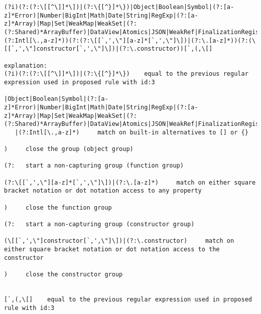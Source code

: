 \begin{lstlisting}[style=basicStyle, caption=Regular expression of proposed rule id:4, label={lst:constructorruleproposalregexC}]
(?i)(?:(?:\[[^\]]*\])|(?:\{[^}]*\})|Object|Boolean|Symbol|(?:[a-z]*Error)|Number|BigInt|Math|Date|String|RegExp|(?:[a-z]*Array)|Map|Set|WeakMap|WeakSet|(?:(?:Shared)*ArrayBuffer)|DataView|Atomics|JSON|WeakRef|FinalizationRegistry|Iterator|AsyncIterator|Promise|GeneratorFunction|AsyncGeneratorFunction|Generator|AsyncGenerator|AsyncFunction|Reflect|Proxy|(?:Intl[\.,a-z]*))(?:(?:\[[`,',\"][a-z]*[`,',\"]\])|(?:\.[a-z]*))(?:(\[[`,',\"]constructor[`,',\"]\])|(?:\.constructor))[`,(,\[]

explanation:
(?i)(?:(?:\[[^\]]*\])|(?:\{[^}]*\})    equal to the previous regular expression used in proposed rule with id:3

|Object|Boolean|Symbol|(?:[a-z]*Error)|Number|BigInt|Math|Date|String|RegExp|(?:[a-z]*Array)|Map|Set|WeakMap|WeakSet|(?:(?:Shared)*ArrayBuffer)|DataView|Atomics|JSON|WeakRef|FinalizationRegistry|Iterator|AsyncIterator|Promise|GeneratorFunction|AsyncGeneratorFunction|Generator|AsyncGenerator|AsyncFunction|Reflect|Proxy
   |(?:Intl[\.,a-z]*)     match on built-in alternatives to [] or {}

)     close the group (object group)

(?:   start a non-capturing group (function group)

(?:\[[`,',\"][a-z]*[`,',\"]\])|(?:\.[a-z]*)     match on either square bracket notation or dot notation access to any property

)     close the function group

(?:   start a non-capturing group (constructor group)

(\[[`,',\"]constructor[`,',\"]\])|(?:\.constructor)     match on either square bracket notation or dot notation access to the constructor

)     close the constructor group


[`,(,\[]    equal to the previous regular expression used in proposed rule with id:3
\end{lstlisting}
